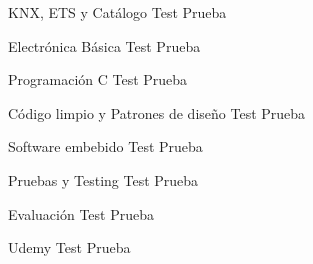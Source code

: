 \ReportSection
{KNX, ETS y Catálogo}{}
{
    Test
}
{
    Prueba
}

\ReportSection
{Electrónica Básica}{}
{
    Test
}
{
    Prueba
}

\ReportSection
{Programación C}{}
{
    Test
}
{
    Prueba
}

\ReportSection
{Código limpio y Patrones de diseño}{}
{
    Test
}
{
    Prueba
}

\ReportSection
{Software embebido}{}
{
    Test
}
{
    Prueba
}

\ReportSection
{Pruebas y Testing}{}
{
    Test
}
{
    Prueba
}

\ReportSection
{Evaluación}{}
{
    Test
}
{
    Prueba
}

\ReportSection
{Udemy}{}
{
    Test
}
{
    Prueba
}
